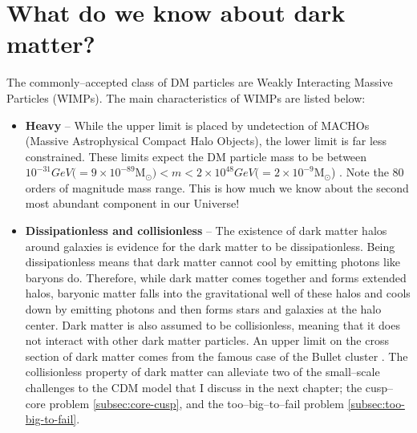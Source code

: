 \documentclass[a4wide,12pt]{book}
\newcommand{\msun }{$\mathrm{M}_{\odot}$}
\newcommand{\ignore}[1]{}
\begin{document}
{\section{What do we know about dark matter?}
\label{subsec:current state}
The commonly--accepted class of DM particles are Weakly Interacting Massive Particles (WIMPs). The main characteristics of WIMPs are listed below:
  \begin{itemize}
  \item {\bf Heavy} -- \ignore{The observational upper and lower bounds for dark matter particles come from different sources. }While the upper limit is placed by undetection of MACHOs (Massive Astrophysical Compact Halo Objects), the lower limit is far less constrained.\ignore{ Neither the Kepler satellite \citep[][]{Griest+2014}, nor microlensing surveys \citep[][]{Alcock+1998, Yoo+2004} did not detect MACHOs as predicted.} These limits expect the DM particle mass to be between $10^\mathrm{-31} GeV (= 9\times 10^\mathrm{-89}$\msun  $) < m < 2\times 10^\mathrm{48} GeV (= 2 \times 10^\mathrm{-9}$\msun ) \citep[\ignore{47 for lower bound}][\ignore{ and 42 \& 43 for the upper bound}]{Hu+2000, Alcock+1998, Yoo+2004}. Note the 80 orders of magnitude mass range. This is how much we know about the second most abundant component in our Universe!
  \item {\bf Dissipationless and collisionless} -- The existence of dark matter halos around galaxies is evidence for the dark matter to be dissipationless. Being dissipationless means that dark matter cannot cool by emitting photons like baryons do. Therefore, while dark matter comes together and forms extended halos, baryonic matter falls into the gravitational well of these halos and cools down by emitting photons and then forms stars and galaxies at the halo center. Dark matter is also assumed to be collisionless, meaning that it does not interact with other dark matter particles. An upper limit on the cross section of dark matter comes from the famous case of the Bullet cluster \citep[][]{Clowe+2006}. The collisionless property of dark matter can alleviate two of the small--scale challenges to the CDM model that I discuss in the next chapter; the cusp--core problem \ref{subsec:core-cusp}, and the too--big--to--fail problem \ref{subsec:too-big-to-fail}.

\end{itemize}}
\end{document}
